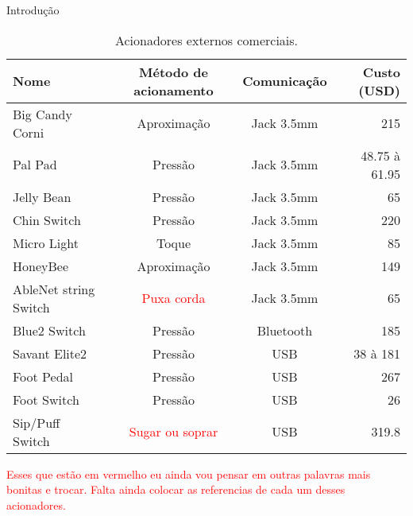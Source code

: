 \begin{chapter}{Introdução}
\begin{table}[!h]
\centering
\caption{Acionadores externos comerciais.}
\label{tab:ibge}
\def\arraystretch{1.25}
\begin{tabular}{lccr}
	\hline
	\hline
	\textbf{Nome} & \textbf{Método de acionamento} & \textbf{Comunicação} & \textbf{Custo (USD)} \\
	\hline
	Big Candy Corni~\cite{CandyCorn}            & Aproximação  & Jack 3.5mm   & 215              \\
	Pal Pad~\cite{PalPad}                       & Pressão      & Jack 3.5mm   &  48.75 à 61.95   \\
	Jelly Bean~\cite{JellyBean}                 & Pressão      & Jack 3.5mm   &   65             \\
	Chin Switch~\cite{Chin}                     & Pressão      & Jack 3.5mm   & 220              \\
	Micro Light~\cite{MicroLight}               & Toque        & Jack 3.5mm   & 85               \\ 
	HoneyBee~\cite{HoneyBee}                    & Aproximação  & Jack 3.5mm   & 149              \\
	AbleNet string Switch~\cite{StringSwitch}   & \textcolor{red}{Puxa corda} & Jack 3.5mm & 65  \\
	Blue2 Switch~\cite{Blue2}                   & Pressão      & Bluetooth    & 185              \\
	Savant Elite2~\cite{SavantElite2}           & Pressão      & USB          & 38 à 181         \\
	Foot Pedal~\cite{FootPedal}                 & Pressão      & USB          & 267              \\
	Foot Switch~\cite{FootSwitch}               & Pressão      & USB          & 26               \\
	Sip/Puff Switch~\cite{SipPuff}              & \textcolor{red}{Sugar ou soprar} & USB & 319.8  \\  
	
	\hline
	\hline
\end{tabular}
\end{table}

\textcolor{red}{Esses que estão em vermelho eu ainda vou pensar em outras
palavras mais bonitas e trocar. Falta ainda colocar as referencias de cada um
desses acionadores.}


\end{chapter}
